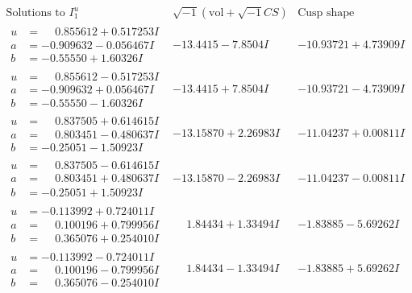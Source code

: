 \documentclass[1p]{elsarticle_modified}
\theoremstyle{definition}
\newcommand{\I}{\sqrt{-1}}
\begin{document}
$$\begin{array}{c|c|c}  
\text{Solutions to }I^u_{1}& \I (\text{vol} + \sqrt{-1}CS) & \text{Cusp shape}\\
 \hline 
\begin{aligned}
u &= \phantom{-}0.855612 + 0.517253 I \\
a &= -0.909632 - 0.056467 I \\
b &= -0.55550 + 1.60326 I\end{aligned}
 & -13.4415 - 7.8504 I & -10.93721 + 4.73909 I \\ \hline\begin{aligned}
u &= \phantom{-}0.855612 - 0.517253 I \\
a &= -0.909632 + 0.056467 I \\
b &= -0.55550 - 1.60326 I\end{aligned}
 & -13.4415 + 7.8504 I & -10.93721 - 4.73909 I \\ \hline\begin{aligned}
u &= \phantom{-}0.837505 + 0.614615 I \\
a &= \phantom{-}0.803451 - 0.480637 I \\
b &= -0.25051 - 1.50923 I\end{aligned}
 & -13.15870 + 2.26983 I & -11.04237 + 0.00811 I \\ \hline\begin{aligned}
u &= \phantom{-}0.837505 - 0.614615 I \\
a &= \phantom{-}0.803451 + 0.480637 I \\
b &= -0.25051 + 1.50923 I\end{aligned}
 & -13.15870 - 2.26983 I & -11.04237 - 0.00811 I \\ \hline\begin{aligned}
u &= -0.113992 + 0.724011 I \\
a &= \phantom{-}0.100196 + 0.799956 I \\
b &= \phantom{-}0.365076 + 0.254010 I\end{aligned}
 & \phantom{-}1.84434 + 1.33494 I & -1.83885 - 5.69262 I \\ \hline\begin{aligned}
u &= -0.113992 - 0.724011 I \\
a &= \phantom{-}0.100196 - 0.799956 I \\
b &= \phantom{-}0.365076 - 0.254010 I\end{aligned}
 & \phantom{-}1.84434 - 1.33494 I & -1.83885 + 5.69262 I \\ \hline\begin{aligned}

\end{aligned}
\end{array}$$
\end{document}
